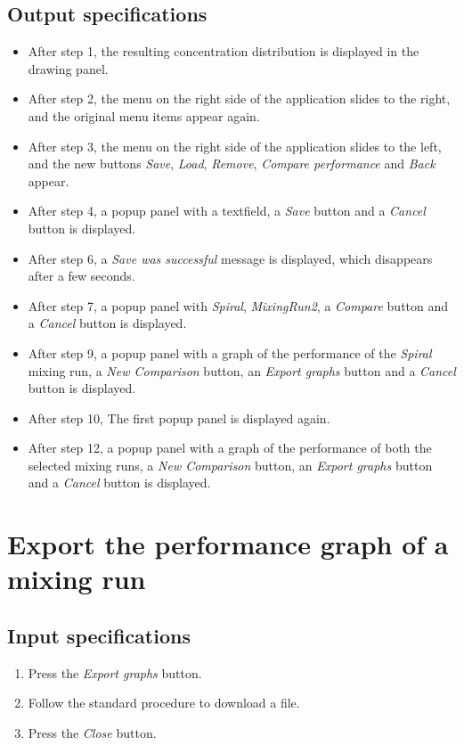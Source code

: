 \subsection*{Output specifications}
\begin{itemize}
\item After step 1, the resulting concentration distribution is displayed in the drawing panel.
\item After step 2, the menu on the right side of the application slides to the right, and the original menu items appear again.
\item After step 3, the menu on the right side of the application slides to the left, and the new buttons \emph{Save}, \emph{Load}, \emph{Remove}, \emph{Compare performance} and \emph{Back} appear.
\item After step 4, a popup panel with a textfield, a \emph{Save} button and a \emph{Cancel} button is displayed.

\item After step 6, a \emph{Save was successful} message is displayed, which disappears after a few seconds.
\item After step 7, a popup panel with \emph{Spiral}, \emph{MixingRun2}, a \emph{Compare} button and a \emph{Cancel} button is displayed.
\item After step 9, a popup panel with a graph of the performance of the \emph{Spiral} mixing run, a \emph{New Comparison} button, an \emph{Export graphs} button and a \emph{Cancel} button is displayed.
\item After step 10, The first popup panel is displayed again.

\item After step 12, a popup panel with a graph of the performance of both the selected mixing runs, a \emph{New Comparison} button, an \emph{Export graphs} button and a \emph{Cancel} button is displayed.
\end{itemize}

\section{Export the performance graph of a mixing run}

\subsection*{Input specifications}
\begin{enumerate}
\item Press the \emph{Export graphs} button.
\item Follow the standard procedure to download a file.
\item Press the \emph{Close} button.
\end{enumerate}

